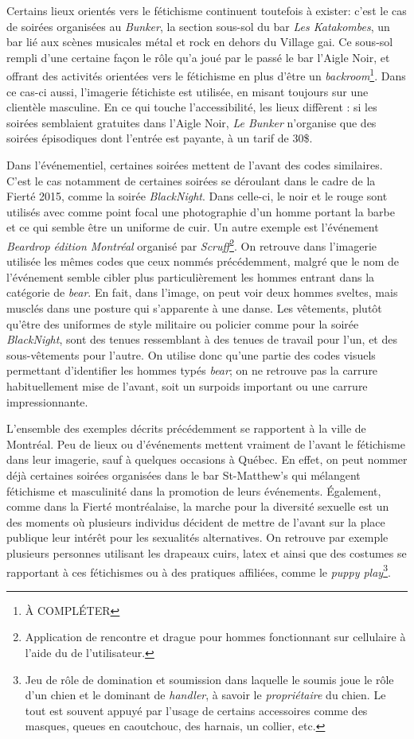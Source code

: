Certains lieux orientés vers le fétichisme continuent toutefois à exister: c'est le cas de soirées organisées au \emph{Bunker}, la section sous-sol du bar \emph{Les Katakombes}, un bar lié aux scènes musicales métal et rock en dehors du Village gai. 
Ce sous-sol rempli d'une certaine façon le rôle qu'a joué par le passé le bar l'Aigle Noir, et offrant des activités orientées vers le fétichisme en plus d'être un \emph{backroom}\footnote{À COMPLÉTER}. 
Dans ce cas-ci aussi, l'imagerie fétichiste est utilisée, en misant toujours sur une clientèle masculine. 
En ce qui touche l'accessibilité, les lieux diffèrent : si les soirées semblaient gratuites dans l'Aigle Noir, \emph{Le Bunker} n'organise que des soirées épisodiques dont l'entrée est payante, à un tarif de 30\$.

Dans l'événementiel, certaines soirées mettent de l'avant des codes similaires.
C'est le cas notamment de certaines soirées se déroulant dans le cadre de la Fierté 2015, comme la soirée  \emph{BlackNight}.
Dans celle-ci, le noir et le rouge sont utilisés avec comme point focal une photographie d'un homme portant la barbe et ce qui semble être un uniforme de cuir.
Un autre exemple est l'événement \emph{Beardrop édition Montréal} organisé par \emph{Scruff}\footnote{Application de rencontre et drague pour hommes fonctionnant sur cellulaire à l'aide du \gps{} de l'utilisateur.}.
On retrouve dans l'imagerie utilisée les mêmes codes que ceux nommés précédemment, malgré que le nom de l'événement semble cibler plus particulièrement les hommes entrant dans la catégorie de \emph{bear}.
En fait, dans l'image, on peut voir deux hommes sveltes, mais musclés dans une posture qui s'apparente à une danse.
Les vêtements, plutôt qu'être des uniformes de style militaire ou policier comme pour la soirée \emph{BlackNight}, sont des tenues ressemblant à des tenues de travail pour l'un, et des sous-vêtements pour l'autre.
On utilise donc qu'une partie des codes visuels permettant d'identifier les hommes typés \emph{bear}; on ne retrouve pas la carrure habituellement mise de l'avant, soit un surpoids important ou une carrure impressionnante.

L'ensemble des exemples décrits précédemment se rapportent à la ville de Montréal.
Peu de lieux ou d'événements mettent vraiment de l'avant le fétichisme dans leur imagerie, sauf à quelques occasions à Québec.
En effet, on peut nommer déjà certaines soirées organisées dans le bar St-Matthew's qui mélangent fétichisme et masculinité dans la promotion de leurs événements.
Également, comme dans la Fierté montréalaise, la marche pour la diversité sexuelle est un des moments où plusieurs individus décident de mettre de l'avant sur la place publique leur intérêt pour les sexualités alternatives.
On retrouve par exemple plusieurs personnes utilisant les drapeaux cuirs, latex et \bdsm{} ainsi que des costumes se rapportant à ces fétichismes ou à des pratiques affiliées, comme le \emph{puppy play}\footnote{Jeu de rôle de domination et soumission dans laquelle le soumis joue le rôle d'un chien  et le dominant de \emph{handler}, à savoir le \emph{propriétaire} du chien. 
Le tout est souvent appuyé par l'usage de certains accessoires comme des masques, queues en caoutchouc, des harnais, un collier, etc.}.

